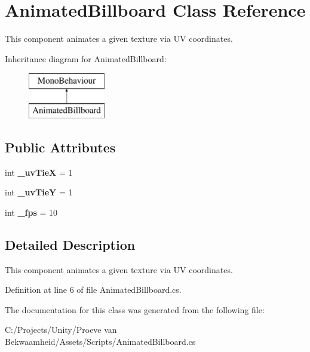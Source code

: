 \hypertarget{class_animated_billboard}{\section{Animated\+Billboard Class Reference}
\label{class_animated_billboard}
}


This component animates a given texture via U\+V coordinates.  


Inheritance diagram for Animated\+Billboard\+:\begin{figure}[H]
\begin{center}
\leavevmode
\includegraphics[height=2.000000cm]{class_animated_billboard}
\end{center}
\end{figure}
\subsection*{Public Attributes}
\begin{DoxyCompactItemize}
\item 
\hypertarget{class_animated_billboard_a10edd130c334ea6aa0444c3338e65d8c}{int {\bfseries \+\_\+uv\+Tie\+X} = 1}\label{class_animated_billboard_a10edd130c334ea6aa0444c3338e65d8c}

\item 
\hypertarget{class_animated_billboard_a059abeaabfc49d03b412947b44397bc7}{int {\bfseries \+\_\+uv\+Tie\+Y} = 1}\label{class_animated_billboard_a059abeaabfc49d03b412947b44397bc7}

\item 
\hypertarget{class_animated_billboard_a521d074d952fea3d579e4a8b40ac91ea}{int {\bfseries \+\_\+fps} = 10}\label{class_animated_billboard_a521d074d952fea3d579e4a8b40ac91ea}

\end{DoxyCompactItemize}


\subsection{Detailed Description}
This component animates a given texture via U\+V coordinates. 



Definition at line 6 of file Animated\+Billboard.\+cs.



The documentation for this class was generated from the following file\+:\begin{DoxyCompactItemize}
\item 
C\+:/\+Projects/\+Unity/\+Proeve van Bekwaamheid/\+Assets/\+Scripts/Animated\+Billboard.\+cs\end{DoxyCompactItemize}
